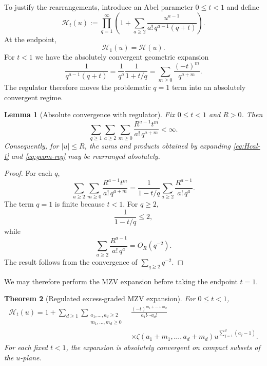 \documentclass[11pt]{article}
\newtheorem{theorem}{Theorem}[section]
\newtheorem{lemma}[theorem]{Lemma}
\theoremstyle{definition}
\begin{document}
To justify the rearrangements, introduce an Abel parameter
$0\leq t<1$ and define
\begin{equation}\label{eq:Hcal-t}
 \mathcal H_t(u)
 :=
 \prod_{q=1}^\infty
 \left(
 1+
 \sum_{a\geq2}
 \frac{u^{a-1}}
 {a!\,q^{a-1}(q+t)}
 \right).
\end{equation}
At the endpoint,
\[
        \mathcal H_1(u)=\mathcal H(u).
\]
For $t<1$ we have the absolutely convergent geometric expansion
\begin{equation}\label{eq:geom-reg}
 \frac{1}{q^{a-1}(q+t)}
 =
 \frac1{q^a}\frac1{1+t/q}
 =
 \sum_{m\geq0}
 \frac{(-t)^m}{q^{a+m}}.
\end{equation}
The regulator therefore moves the problematic $q=1$ term into an
absolutely convergent regime.

\begin{lemma}[Absolute convergence with regulator]
\label{lem:regabs}
Fix $0\leq t<1$ and $R>0$.  Then
\begin{equation}\label{eq:regabs}
 \sum_{q\geq1}
 \sum_{a\geq2}
 \sum_{m\geq0}
 \frac{R^{a-1}t^m}
 {a!\,q^{a+m}}
 <\infty.
\end{equation}
Consequently, for $|u|\leq R$, the sums and products obtained by
expanding \eqref{eq:Hcal-t} and \eqref{eq:geom-reg} may be rearranged
absolutely.
\end{lemma}

\begin{proof}
For each $q$,
\[
 \sum_{a\geq2}\sum_{m\geq0}
 \frac{R^{a-1}t^m}
 {a!\,q^{a+m}}
 =
 \frac{1}{1-t/q}
 \sum_{a\geq2}
 \frac{R^{a-1}}{a!\,q^a}.
\]
The term $q=1$ is finite because $t<1$.  For $q\geq2$,
\[
        \frac{1}{1-t/q}\leq2,
\]
while
\[
        \sum_{a\geq2}
        \frac{R^{a-1}}{a!\,q^a}
        =
        O_R(q^{-2}).
\]
The result follows from the convergence of
$\sum_{q\geq2}q^{-2}$.
\end{proof}

We may therefore perform the MZV expansion before taking the endpoint
$t=1$.

\begin{theorem}[Regulated excess-graded MZV expansion]
\label{thm:MZVreg}
For $0\leq t<1$,
\begin{align}
 \mathcal H_t(u)
 =
 1+
 \sum_{d\geq1}
 \sum_{\substack{a_1,\ldots,a_d\geq2\\
                 m_1,\ldots,m_d\geq0}}
 &
 \frac{(-t)^{m_1+\cdots+m_d}}
 {a_1!\cdots a_d!}
 \nonumber\\
 &\times
 \zeta(a_1+m_1,\ldots,a_d+m_d)
 u^{\sum_{j=1}^d(a_j-1)}.
 \label{eq:MZVreg}
\end{align}
For each fixed $t<1$, the expansion is absolutely convergent on
compact subsets of the $u$-plane.
\end{theorem}
\end{document}
